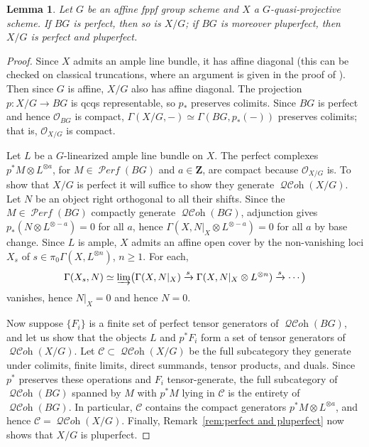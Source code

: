 \documentclass[12pt, oneside]{amsart}
\numberwithin{equation}{section}
\newtheorem{lemma}[subsubsection]{Lemma}
\theoremstyle{remark}
\theoremstyle{plain}
\renewcommand{\ge}{\geqslant}
\DeclareMathOperator{\QCOH}{\mathcal{QC}\textit{oh}}
\DeclareMathOperator{\PERF}{\mathcal{P}\textit{erf}}
\newcommand{\OO}{\mathcal{O}}
\begin{document}
\begin{lemma}\label{lem:BG pluperf implies X/G pluperf}
  Let $G$ be an affine fppf group scheme and $X$ a $G$-quasi-projective scheme.
  If $BG$ is perfect, then so is $X/G$; if $BG$ is moreover pluperfect, then $X/G$ is perfect and pluperfect.
\end{lemma}
\begin{proof}
Since $X$ admits an ample line bundle, it has affine diagonal (this can be checked on classical truncations, where an argument is given in the proof of \cite[Cor.~2.3.3]{ThomasonTrobaugh}).
Then since $G$ is affine, $X/G$ also has affine diagonal.
The projection $p : X/G \to BG$ is qcqs representable, so $p_*$ preserves colimits.
Since $BG$ is perfect and hence $\OO_{BG}$ is compact, $\Gamma(X/G,-) \simeq \Gamma(BG, p_*(-))$ preserves colimits; that is, $\OO_{X/G}$ is compact.

Let $L$ be a $G$-linearized ample line bundle on $X$.
The perfect complexes $p^*M \otimes L^{\otimes a}$, for $M \in \PERF(BG)$ and $a \in \mathbf{Z}$, are compact because $\OO_{X/G}$ is.
To show that $X/G$ is perfect it will suffice to show they generate $\QCOH(X/G)$.
Let $N$ be an object right orthogonal to all their shifts.
Since the $M \in \PERF(BG)$ compactly generate $\QCOH(BG)$, adjunction gives
$p_*(N \otimes L^{\otimes -a}) = 0$ for all $a$, hence $\Gamma(X, N|_X \otimes L^{\otimes -a}) = 0$ for all $a$ by base change.
Since $L$ is ample, $X$ admits an affine open cover by the non-vanishing loci $X_s$ of $s \in \pi_0\Gamma(X, L^{\otimes n})$, $n\ge 1$.
For each,
\[\Gamma(X_s, N) \simeq \varinjlim \bigl(\Gamma(X, N|_X) \xrightarrow{s} \Gamma(X, N|_X \otimes L^{\otimes n}) \xrightarrow{s} \cdots\bigr)\]
vanishes, hence $N|_X = 0$ and hence $N = 0$.

Now suppose $\{F_i\}$ is a finite set of perfect tensor generators of $\QCOH(BG)$, and let us show that the objects $L$ and $p^*F_i$ form a set of tensor generators of $\QCOH(X/G)$.
Let $\mathcal{C} \subset \QCOH(X/G)$ be the full subcategory they generate under colimits, finite limits, direct summands, tensor products, and duals.
Since $p^*$ preserves these operations and $F_i$ tensor-generate, the full subcategory of $\QCOH(BG)$ spanned by $M$ with $p^*M$ lying in $\mathcal{C}$ is the entirety of $\QCOH(BG)$.
In particular, $\mathcal{C}$ contains the compact generators $p^*M \otimes L^{\otimes a}$, and hence $\mathcal{C} = \QCOH(X/G)$.
Finally, Remark~\ref{rem:perfect and pluperfect} now shows that $X/G$ is pluperfect.
\end{proof}
\end{document}
